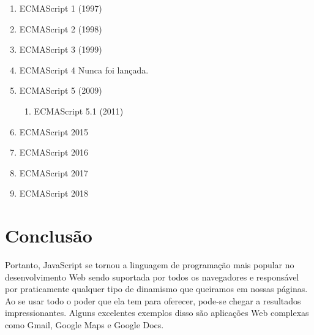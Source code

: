 \begin{enumerate}
  \item ECMAScript 1 (1997)	
  \item ECMAScript 2 (1998)	
  \item ECMAScript 3 (1999)	
  \item ECMAScript 4	Nunca foi lançada.
  \item ECMAScript 5 (2009)
    \begin{enumerate}[label*=\arabic*.]
    \item ECMAScript 5.1 (2011)
    \end{enumerate}
  \item ECMAScript 2015
  \item ECMAScript 2016
  \item ECMAScript 2017
  \item ECMAScript 2018
\end{enumerate}

\section{Conclusão}
Portanto, JavaScript se tornou a linguagem de programação mais popular no desenvolvimento Web sendo suportada por todos os navegadores e responsável por praticamente qualquer tipo de dinamismo que queiramos em nossas páginas. Ao se usar todo o poder que ela tem para oferecer, pode-se chegar a resultados impressionantes. Alguns excelentes exemplos disso são aplicações Web complexas como Gmail, Google Maps e Google Docs. 
